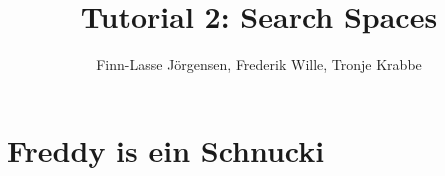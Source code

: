 \documentclass[12pt,a4paper]{article}
\author{Finn-Lasse Jörgensen, Frederik Wille, Tronje Krabbe}
\title{Tutorial 2: Search Spaces}
\begin{document}
\maketitle


\section*{Freddy is ein Schnucki}
\end{document}
